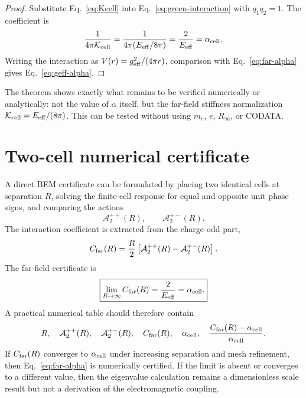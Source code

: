 \documentclass[11pt]{article}
\newcommand{\Eeff}{E_{\rm eff}}
\newcommand{\alphacell}{\alpha_{\rm cell}}
\newcommand{\Kcell}{\mathcal K_{\rm cell}}
\newcommand{\Cfar}{C_{\rm far}}
\newcommand{\Atwo}{\mathcal A_{2}}
\begin{document}
\begin{proof}
Substitute Eq.~\eqref{eq:Kcell} into Eq.~\eqref{eq:green-interaction} with \(q_1q_2=1\). The coefficient is
\begin{equation}
\frac{1}{4\pi\Kcell}
=
\frac{1}{4\pi(\Eeff/8\pi)}
=
\frac{2}{\Eeff}
=\alphacell.
\end{equation}
Writing the interaction as \(V(r)=g_{\rm eff}^2/(4\pi r)\), comparison with Eq.~\eqref{eq:far-alpha} gives Eq.~\eqref{eq:geff-alpha}.
\end{proof}

The theorem shows exactly what remains to be verified numerically or analytically: not the value of \(\alpha\) itself, but the far-field stiffness normalization \(\Kcell=\Eeff/(8\pi)\). This can be tested without using \(m_e\), \(e\), \(R_\infty\), or CODATA.

\section{Two-cell numerical certificate}
\label{sec:twocell}

A direct BEM certificate can be formulated by placing two identical cells at separation \(R\), solving the finite-cell response for equal and opposite unit phase signs, and comparing the actions
\begin{equation}
\Atwo^{++}(R),
\qquad
\Atwo^{+-}(R).
\end{equation}
The interaction coefficient is extracted from the charge-odd part,
\begin{equation}
\Cfar(R)
=
\frac{R}{2}\left[\Atwo^{++}(R)-\Atwo^{+-}(R)\right].
\label{eq:CfarR}
\end{equation}
The far-field certificate is
\begin{equation}
\boxed{
\lim_{R\to\infty}\Cfar(R)=\frac{2}{\Eeff}=\alphacell.
}
\label{eq:certificate}
\end{equation}
A practical numerical table should therefore contain
\begin{equation}
R,
\quad
\Atwo^{++}(R),
\quad
\Atwo^{+-}(R),
\quad
\Cfar(R),
\quad
\alphacell,
\quad
\frac{\Cfar(R)-\alphacell}{\alphacell}.
\end{equation}
If \(\Cfar(R)\) converges to \(\alphacell\) under increasing separation and mesh refinement, then Eq.~\eqref{eq:far-alpha} is numerically certified. If the limit is absent or converges to a different value, then the eigenvalue calculation remains a dimensionless scale result but not a derivation of the electromagnetic coupling.
\end{document}
